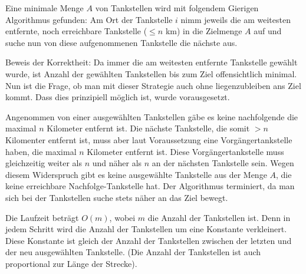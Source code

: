 \documentclass[a4paper,10pt]{scrartcl}
\begin{document}
Eine minimale Menge $A$ von Tankstellen wird mit folgendem Gierigen Algorithmus gefunden:
Am Ort der Tankstelle $i$ nimm jeweils die am weitesten entfernte, noch erreichbare Tankstelle ($\le n$ km) in die Zielmenge $A$ auf und suche nun von diese aufgenommenen Tankstelle die nächste aus.

Beweis der Korrektheit:
Da immer die am weitesten entfernte Tankstelle gewählt wurde, ist Anzahl der gewählten Tankstellen bis zum Ziel offensichtlich minimal.
Nun ist die Frage, ob man mit dieser Strategie auch ohne liegenzubleiben ans Ziel kommt. Dass dies prinzipiell möglich ist, wurde vorausgesetzt.

Angenommen von einer ausgewählten Tankstellen gäbe es keine nachfolgende die maximal $n$ Kilometer entfernt ist. Die nächste Tankstelle, die somit $> n$ Kilomenter entfernt ist, muss aber laut Voraussetzung eine
Vorgängertankstelle haben, die maximal $n$ Kilometer entfernt ist. Diese Vorgängertankstelle muss gleichzeitig weiter als $n$ und näher als $n$ an der nächsten Tankstelle sein. Wegen diesem Widerspruch
gibt es keine ausgewählte Tankstelle aus der Menge $A$, die keine erreichbare Nachfolge-Tankstelle hat.
Der Algorithmus terminiert, da man sich bei der Tankstellen suche stets näher an das Ziel bewegt.


Die Laufzeit beträgt $O(m)$, wobei $m$ die Anzahl der Tankstellen ist. Denn in jedem Schritt wird die Anzahl der Tankstellen um eine Konstante verkleinert. Diese Konstante ist gleich der Anzahl der Tankstellen
zwischen der letzten und der neu ausgewählten Tankstelle. (Die Anzahl der Tankstellen ist auch proportional zur Länge der Strecke).
\end{document}
